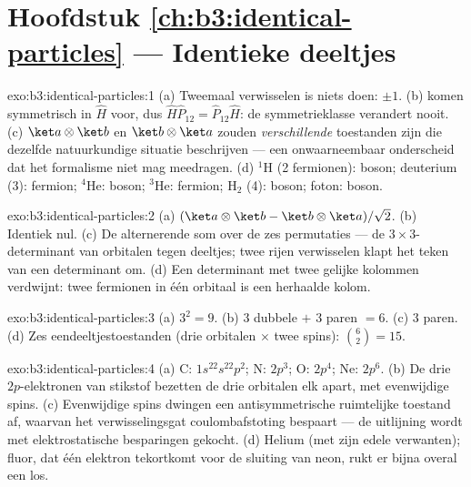\section*{Hoofdstuk \ref{ch:b3:identical-particles} --- Identieke deeltjes}

\begin{solution}{exo:b3:identical-particles:1}
(a) Tweemaal verwisselen is niets doen:  $\pm1$. (b)
 komen symmetrisch in $\hat H$ voor, dus $\hat H\hat
P_{12} = \hat P_{12}\hat H$: de symmetrieklasse verandert nooit. (c)
$\ket a\otimes\ket b$ en $\ket b\otimes\ket a$ zouden
\emph{verschillende} toestanden zijn die dezelfde natuurkundige situatie
beschrijven --- een onwaarneembaar onderscheid dat het formalisme niet mag
meedragen. (d) $^1$H (2 fermionen): boson; deuterium (3): fermion;
$^4$He: boson; $^3$He: fermion; H$_2$ (4): boson; foton: boson.
\end{solution}

\begin{solution}{exo:b3:identical-particles:2}
(a) $(\ket a\otimes\ket b - \ket b\otimes\ket a)/\sqrt2$. (b)
Identiek nul. (c) De alternerende som over de zes permutaties --- de
$3\times3$-determinant van orbitalen tegen deeltjes; twee rijen
verwisselen klapt het teken van een determinant om. (d) Een determinant
met twee gelijke kolommen verdwijnt: twee fermionen in één orbitaal is een
herhaalde kolom.
\end{solution}

\begin{solution}{exo:b3:identical-particles:3}
(a) $3^2 = 9$. (b) $3$ dubbele $+$ $3$ paren $= 6$. (c) $3$ paren.
(d) Zes eendeeltjestoestanden (drie orbitalen $\times$ twee spins):
$\binom62 = 15$.
\end{solution}

\begin{solution}{exo:b3:identical-particles:4}
(a) C: $1s^22s^22p^2$; N: $2p^3$; O: $2p^4$; Ne: $2p^6$. (b) De drie
$2p$-elektronen van stikstof bezetten de drie orbitalen elk apart, met
evenwijdige spins. (c) Evenwijdige spins dwingen een antisymmetrische
ruimtelijke toestand af, waarvan het verwisselingsgat coulombafstoting
bespaart --- de uitlijning wordt met elektrostatische besparingen gekocht.
(d) Helium (met zijn edele verwanten); fluor, dat één elektron tekortkomt
voor de sluiting van neon, rukt er bijna overal een los.
\end{solution}

